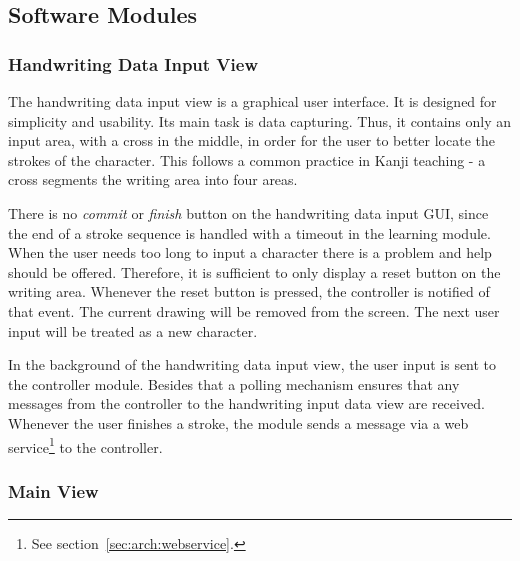 \subsection{Software Modules}
\label{sec:arch:softwaremodules}

\subsubsection{Handwriting Data Input View}
\label{sec:arch:handwritingdatainputview}


The handwriting data input view is a graphical user interface. It is designed for
simplicity and usability. Its main task is data capturing.
Thus, it contains only an input area, with a cross in the middle, 
in order for the user to better locate the strokes of the character. 
This follows a common practice in Kanji 
teaching - a cross segments the writing area into four areas.

There is no \emph{commit} or \emph{finish} button on the handwriting data 
input GUI, since the end of a stroke sequence is handled with a timeout in 
the learning module. When the user needs too long to input a character there 
is a problem and help should be offered.
Therefore, it is sufficient to only display a reset button on the writing area.
Whenever the reset button is pressed, the controller is notified of that event.
The current drawing will be removed from the screen. The next user input will
be treated as a new character.

In the background of the handwriting data input view, the user input is sent to 
the controller module. Besides that a polling mechanism ensures that any 
messages from the controller to the handwriting input data view are received.
Whenever the user finishes a stroke, the module sends a message via a web 
service\footnote{See section~\ref{sec:arch:webservice}.} to the controller.

\subsubsection{Main View}
\label{sec:arch:mainview}


